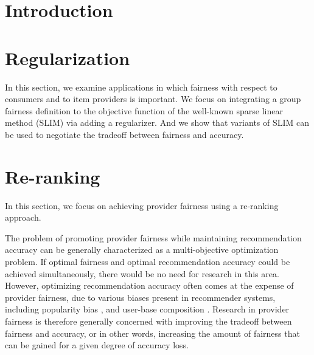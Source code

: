 \documentclass[manuscript,screen,review]{acmart}
\begin{document}

\section{Introduction}

% 


\section{Regularization}
In this section, we examine applications in which fairness with respect to consumers and to item providers is important. We focus on integrating a group fairness definition to the objective function of the well-known sparse linear method (SLIM) via adding a regularizer. And we show that variants of SLIM can be used to negotiate the tradeoff between fairness and accuracy.


\section{Re-ranking}
In this section, we focus on achieving provider fairness using a re-ranking approach.

The problem of promoting provider fairness while maintaining recommendation accuracy can be generally characterized as a multi-objective optimization problem. If optimal fairness and optimal recommendation accuracy could be achieved simultaneously, there would be no need for research in this area. However, optimizing recommendation accuracy often comes at the expense of provider fairness, due to various biases present in recommender systems, including popularity bias \cite{celma2008hits,lee2014fairness}, and user-base composition \cite{lin2019crank, yao2017beyond}. Research in provider fairness is therefore generally concerned with improving the tradeoff between fairness and accuracy, or in other words, increasing the amount of fairness that can be gained for a given degree of accuracy loss.
\end{document}
